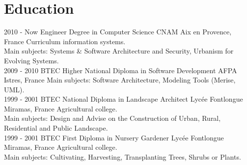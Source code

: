 \documentclass[]{friggeri-cv}
\begin{document}
\section{Education}
\begin{entrylist}
  \entry
    {2010 - Now}
    {Engineer Degree in Computer Science}
    {CNAM Aix en Provence, France}
    {Curriculum information systems.\\
    Main subjects: Systems \& Software Architecture and Security, Urbanism for Evolving Systems.\\}
  \entry
    {2009 - 2010}
    {BTEC Higher National Diploma in Software Development}
    {AFPA Istres, France}
    {Main subjects: Software Architecture, Modeling Tools (Merise, UML).\\}
  \entry
    {1999 - 2001}
    {BTEC National Diploma in Landscape Architect}
    {Lycée Fontlongue Miramas, France}
    {Agricultural college.\\
    Main subjects: Design and Advise on the Construction of Urban, Rural, Residential and Public Landscape.\\}
  \entry
    {1999 - 2001}
    {BTEC First Diploma in Nursery Gardener}
    {Lycée Fontlongue Miramas, France}
    {Agricultural college.\\
    Main subjects: Cultivating, Harvesting, Transplanting Trees, Shrubs or Plants.}
\end{entrylist}
\end{document}
